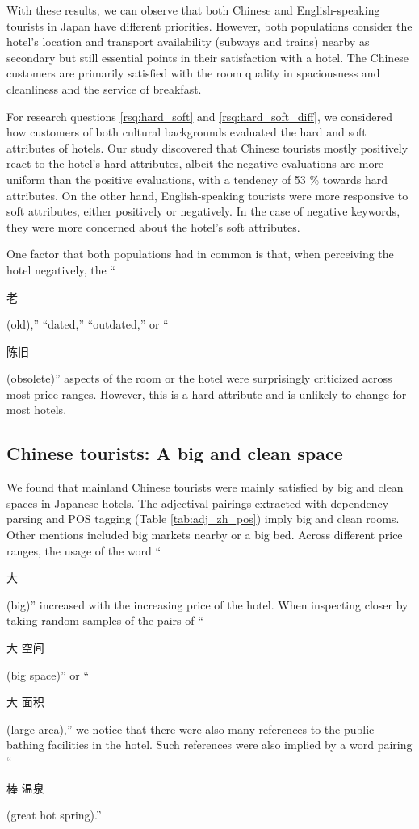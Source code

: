 \documentclass[smallextended,natbib]{svjour3}       %
\begin{document}
    With these results, we can observe that both Chinese and English-speaking tourists in Japan have different priorities. However, both populations consider the hotel's location and transport availability (subways and trains) nearby as secondary but still essential points in their satisfaction with a hotel. The Chinese customers are primarily satisfied with the room quality in spaciousness and cleanliness and the service of breakfast.

    For research questions \ref{rsq:hard_soft} and \ref{rsq:hard_soft_diff}, we considered how customers of both cultural backgrounds evaluated the hard and soft attributes of hotels. Our study discovered that Chinese tourists mostly positively react to the hotel's hard attributes, albeit the negative evaluations are more uniform than the positive evaluations, with a tendency of 53 \% towards hard attributes. On the other hand, English-speaking tourists were more responsive to soft attributes, either positively or negatively. In the case of negative keywords, they were more concerned about the hotel's soft attributes.

    One factor that both populations had in common is that, when perceiving the hotel negatively, the ``\begin{CJK}{UTF8}{gbsn}老\end{CJK} (old),'' ``dated,'' ``outdated,'' or ``\begin{CJK}{UTF8}{gbsn}陈旧\end{CJK} (obsolete)'' aspects of the room or the hotel were surprisingly criticized across most price ranges. However, this is a hard attribute and is unlikely to change for most hotels.

  \subsection{Chinese tourists: A big and clean space}\label{disc:zh}

    We found that mainland Chinese tourists were mainly satisfied by big and clean spaces in Japanese hotels. The adjectival pairings extracted with dependency parsing and POS tagging (Table \ref{tab:adj_zh_pos})  imply big and clean rooms. Other mentions included big markets nearby or a big bed. Across different price ranges, the usage of the word ``\begin{CJK}{UTF8}{gbsn}大\end{CJK} (big)'' increased with the increasing price of the hotel. When inspecting closer by taking random samples of the pairs of ``\begin{CJK}{UTF8}{gbsn}大 空间\end{CJK} (big space)'' or ``\begin{CJK}{UTF8}{gbsn}大 面积\end{CJK} (large area),'' we notice that there were also many references to the public bathing facilities in the hotel. Such references were also implied by a word pairing ``\begin{CJK}{UTF8}{gbsn}棒 温泉\end{CJK} (great hot spring).'' 
\end{document}
